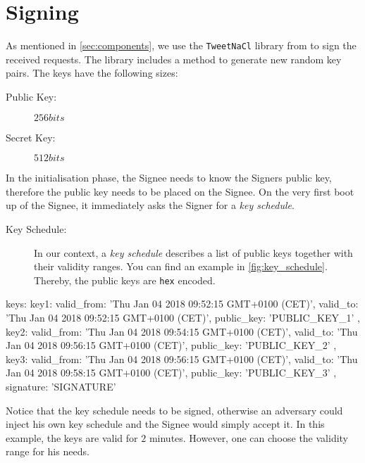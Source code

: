 \section{Signing}
As mentioned in \autoref{sec:components}, we use the \texttt{TweetNaCl} library from \citet{tweetnacl} to sign the received requests. The library includes a method to generate new random key pairs. The keys have the following sizes:

\begin{description}
\item[Public Key:] $256 bits$
\item[Secret Key:] $512 bits$
\end{description}

In the initialisation phase, the Signee needs to know the Signers public key, therefore the public key needs to be placed on the Signee. On the very first boot up of the Signee, it immediately asks the Signer for a \emph{key schedule}.

\begin{description}
\item[Key Schedule:] In our context, a \emph{key schedule} describes a list of public keys together with their validity ranges. You can find an example in \autoref{fig:key_schedule}. Thereby, the public keys are \texttt{hex} encoded.
\end{description}

\begin{code}[captionpos=b, caption={Example of a Key Schedule of length $3$},label={fig:key_schedule}]
{ 
  keys:
   { key1:
      { valid_from: 'Thu Jan 04 2018 09:52:15 GMT+0100 (CET)',
        valid_to: 'Thu Jan 04 2018 09:52:15 GMT+0100 (CET)',
        public_key: 'PUBLIC_KEY_1' },
     key2:
      { valid_from: 'Thu Jan 04 2018 09:54:15 GMT+0100 (CET)',
        valid_to: 'Thu Jan 04 2018 09:56:15 GMT+0100 (CET)',
        public_key: 'PUBLIC_KEY_2' },
     key3:
      { valid_from: 'Thu Jan 04 2018 09:56:15 GMT+0100 (CET)',
        valid_to: 'Thu Jan 04 2018 09:58:15 GMT+0100 (CET)',
        public_key: 'PUBLIC_KEY_3' }
    },
  signature: 'SIGNATURE'
}
\end{code}

Notice that the key schedule needs to be signed, otherwise an adversary could inject his own key schedule and the Signee would simply accept it. In this example, the keys are valid for $2$ minutes. However, one can choose the validity range for his needs.

